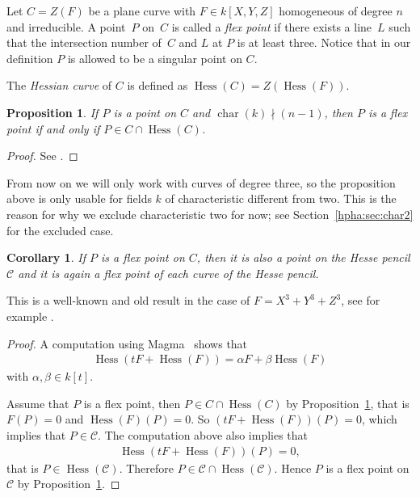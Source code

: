 \documentclass[11pt]{article}
\newcommand{\msetp}[1]{{\left({#1}\right)}}					%
\newcommand{\msets}[1]{{\left[{#1}\right]}}					%
\newcommand{\mchar}[1]{\operatorname{char}\msetp{#1}}			%
\newcommand{\mhess}[1]{\operatorname{Hess}\msetp{#1}}			%
\numberwithin{equation}{section}
\newtheorem{Corollary}[Theorem]{Corollary}
\newtheorem{Proposition}[Theorem]{Proposition}
\begin{document}
Let $C=Z\msetp{F}$ be a plane curve with $F\in k\msets{X,Y,Z}$ homogeneous of degree $n$ and irreducible. A point~$P$ on~$C$ is called a \emph{flex point} if there exists a line~$L$ such that the intersection number of~$C$ and $L$ at $P$ is at least three. Notice that in our definition $P$ is allowed to be a singular point on $C$.

The \emph{Hessian curve} of $C$ is defined as $\mhess{C}=Z\msetp{\mhess{F}}$.

\begin{Proposition}\label{two} If $P$ is a point on $C$ and $\mchar{k}\nmid (n-1)$, then $P$ is a flex point if
and only if $P\in C\cap\mhess{C}$.
\end{Proposition}
\begin{proof}See \cite[Exercise 5.23]{fulton2008}.
\end{proof}

From now on we will only work with curves of degree three, so the proposition above is only usable for fields $k$ of characteristic different from two. This is the reason for why we exclude characteristic two for now; see Section~\ref{hpha:sec:char2} for the excluded case.

\begin{Corollary}\label{corthree} If $P$ is a flex point on $C$, then it is also a point on the Hesse pencil $\mathcal{C}$ and it is again a flex point of each curve of the Hesse pencil.
\end{Corollary}

This is a well-known and old result in the case of $F=X^3+Y^3+Z^3$, see for example \cite[Section~VII.1]{pascal1902}.

\begin{proof}A computation using Magma~\cite{bosma1997} shows that
\begin{gather*}
\mhess{tF+\mhess{F}} =\alpha F+\beta \mhess{F}
\end{gather*}
with $\alpha,\beta\in k\msets{t}$.

Assume that $P$ is a flex point, then $P\in C\cap\mhess{C}$ by Proposition~\ref{two}, that is $F\msetp{P}=0$ and $\mhess{F}\msetp{P}=0$. So $\msetp{tF+\mhess{F}}\msetp{P}=0$, which implies that $P\in\mathcal{C}$. The computation above also implies that
\begin{gather*}
\mhess{tF+\mhess{F}}\msetp{P}=0,
\end{gather*}
that is $P\in\mhess{\mathcal{C}}$. Therefore $P\in\mathcal{C}\cap\mhess{\mathcal{C}}$. Hence $P$ is a flex point on $\mathcal{C}$ by Proposi\-tion~\ref{two}.
\end{proof}
\end{document}
